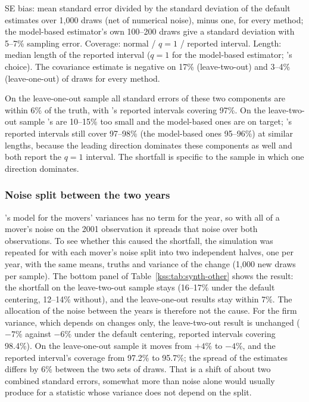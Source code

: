\begin{table}[ht]
\smallskip
\raggedright\footnotesize SE bias: mean standard error divided by the standard deviation of the \fevc{}
default estimates over 1{,}000 draws (net of numerical noise), minus one, for every method; the model-based
estimator's own 100--200 draws give a standard deviation with 5--7\% sampling error. Coverage: normal / $q=1$ /
reported interval. Length: median length of the reported interval ($q=1$ for the model-based estimator; \fevc's
choice). The covariance estimate is negative on 17\% (leave-two-out) and 3--4\% (leave-one-out) of draws for
every method.
\end{table}

On the leave-one-out sample all standard errors of these two components are within 6\% of the truth, with
\fevc's reported intervals covering 97\%. On the leave-two-out sample \fevc's are 10--15\% too small and the
model-based ones are on target; \fevc's reported intervals still cover 97--98\% (the model-based ones 95--96\%) at
similar lengths, because the leading direction dominates these components as well and both report the $q=1$
interval. The shortfall is specific to the sample in which one direction dominates.

\subsubsection{Noise split between the two years}\label{kss:sec:synth-split}

\fevc's model for the movers' variances has no term for the year, so with all of a mover's noise on the 2001
observation it spreads that noise over both observations. To see whether this caused the shortfall, the
simulation was repeated for \fevc{} with each mover's noise split into two independent halves, one per year,
with the same means, truths and variance of the change (1{,}000 new draws per sample). The bottom panel of
Table~\ref{kss:tab:synth-other} shows the result: the shortfall on the leave-two-out sample stays (16--17\% under the
default centering, 12--14\% without), and the leave-one-out results stay within 7\%. The allocation of the
noise between the years is therefore not the cause. For the firm variance, which depends on changes only, the
leave-two-out result is unchanged ($-7\%$ against $-6\%$ under the default centering, reported intervals covering
98.4\%). On the leave-one-out sample it moves from $+4\%$ to $-4\%$, and the reported interval's coverage from
97.2\% to 95.7\%; the spread of the estimates differs by 6\% between the two sets of draws. That is a shift of
about two combined standard errors, somewhat more than noise alone would usually produce for a statistic whose
variance does not depend on the split.

